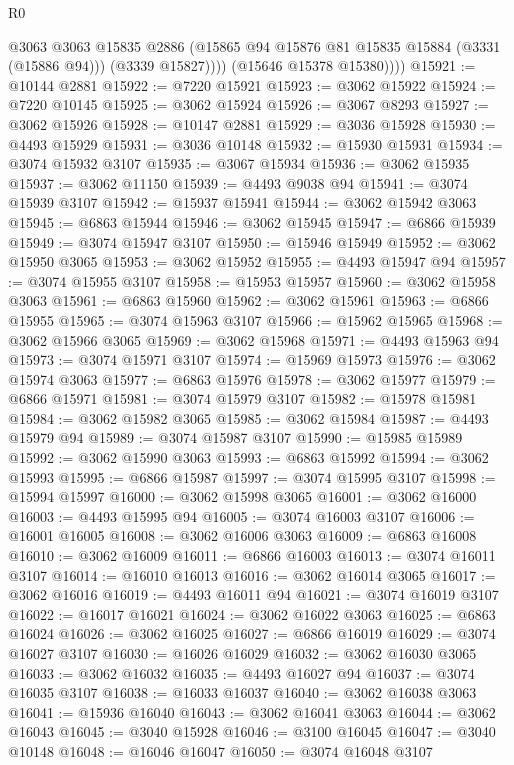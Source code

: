 \begin{lexlean}{R0}
\begin{coremodule}
                @3063
                @3063
                @15835
                @2886
                (@15865 @94 @15876 @81 @15835 @15884 (@3331 (@15886 @94)))
                (@3339 @15827))))
          (@15646 @15378 @15380))))
@15921 := @10144 @2881
@15922 := @7220 @15921
@15923 := @3062 @15922
@15924 := @7220 @10145
@15925 := @3062 @15924
@15926 := @3067 @8293
@15927 := @3062 @15926
@15928 := @10147 @2881
@15929 := @3036 @15928
@15930 := @4493 @15929
@15931 := @3036 @10148
@15932 := @15930 @15931
@15934 := @3074 @15932 @3107
@15935 := @3067 @15934
@15936 := @3062 @15935
@15937 := @3062 @11150
@15939 := @4493 @9038 @94
@15941 := @3074 @15939 @3107
@15942 := @15937 @15941
@15944 := @3062 @15942 @3063
@15945 := @6863 @15944
@15946 := @3062 @15945
@15947 := @6866 @15939
@15949 := @3074 @15947 @3107
@15950 := @15946 @15949
@15952 := @3062 @15950 @3065
@15953 := @3062 @15952
@15955 := @4493 @15947 @94
@15957 := @3074 @15955 @3107
@15958 := @15953 @15957
@15960 := @3062 @15958 @3063
@15961 := @6863 @15960
@15962 := @3062 @15961
@15963 := @6866 @15955
@15965 := @3074 @15963 @3107
@15966 := @15962 @15965
@15968 := @3062 @15966 @3065
@15969 := @3062 @15968
@15971 := @4493 @15963 @94
@15973 := @3074 @15971 @3107
@15974 := @15969 @15973
@15976 := @3062 @15974 @3063
@15977 := @6863 @15976
@15978 := @3062 @15977
@15979 := @6866 @15971
@15981 := @3074 @15979 @3107
@15982 := @15978 @15981
@15984 := @3062 @15982 @3065
@15985 := @3062 @15984
@15987 := @4493 @15979 @94
@15989 := @3074 @15987 @3107
@15990 := @15985 @15989
@15992 := @3062 @15990 @3063
@15993 := @6863 @15992
@15994 := @3062 @15993
@15995 := @6866 @15987
@15997 := @3074 @15995 @3107
@15998 := @15994 @15997
@16000 := @3062 @15998 @3065
@16001 := @3062 @16000
@16003 := @4493 @15995 @94
@16005 := @3074 @16003 @3107
@16006 := @16001 @16005
@16008 := @3062 @16006 @3063
@16009 := @6863 @16008
@16010 := @3062 @16009
@16011 := @6866 @16003
@16013 := @3074 @16011 @3107
@16014 := @16010 @16013
@16016 := @3062 @16014 @3065
@16017 := @3062 @16016
@16019 := @4493 @16011 @94
@16021 := @3074 @16019 @3107
@16022 := @16017 @16021
@16024 := @3062 @16022 @3063
@16025 := @6863 @16024
@16026 := @3062 @16025
@16027 := @6866 @16019
@16029 := @3074 @16027 @3107
@16030 := @16026 @16029
@16032 := @3062 @16030 @3065
@16033 := @3062 @16032
@16035 := @4493 @16027 @94
@16037 := @3074 @16035 @3107
@16038 := @16033 @16037
@16040 := @3062 @16038 @3063
@16041 := @15936 @16040
@16043 := @3062 @16041 @3063
@16044 := @3062 @16043
@16045 := @3040 @15928
@16046 := @3100 @16045
@16047 := @3040 @10148
@16048 := @16046 @16047
@16050 := @3074 @16048 @3107

\end{coremodule}
\end{lexlean}
